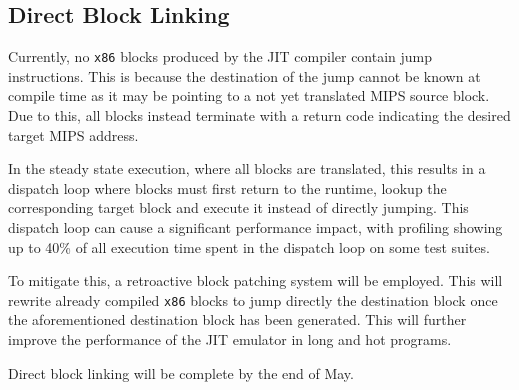\subsection{Direct Block Linking}


Currently, no \texttt{x86} blocks produced by the JIT compiler contain jump instructions. This is because the destination of the jump cannot be known at compile time as it may be pointing to a not yet translated MIPS source block. Due to this, all blocks instead terminate with a return code indicating the desired target MIPS address.

In the steady state execution, where all blocks are translated, this results in a dispatch loop where blocks must first return to the runtime, lookup the corresponding target block and execute it instead of directly jumping. This dispatch loop can cause a significant performance impact, with profiling showing up to 40\% of all execution time spent in the dispatch loop on some test suites.

To mitigate this, a retroactive block patching system will be employed. This will rewrite already compiled \texttt{x86} blocks to jump directly the destination block once the aforementioned destination block has been generated. This will further improve the performance of the JIT emulator in long and hot programs.

Direct block linking will be complete by the end of May.